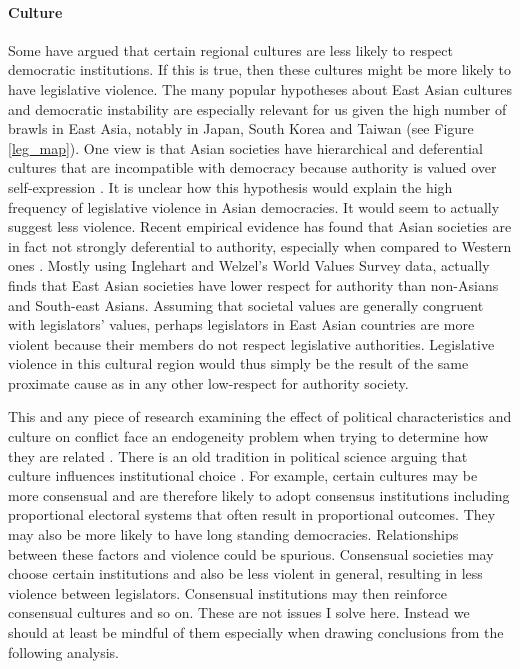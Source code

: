 \documentclass[a4paper]{article}\usepackage[]{graphicx}\usepackage[]{color}
\begin{document}
\paragraph{Culture}

Some have argued that certain regional cultures are less likely to respect democratic institutions. If this is true, then these cultures might be more likely to have legislative violence. The many popular hypotheses about East Asian cultures and democratic instability are especially relevant for us given the high number of brawls in East Asia, notably in Japan, South Korea and Taiwan (see Figure \ref{leg_map}). One view is that Asian societies have hierarchical and deferential cultures that are incompatible with democracy because authority is valued over self-expression \citep[see][212-213 for a discussion]{Dalton2005}. It is unclear how this hypothesis would explain the high frequency of legislative violence in Asian democracies. It would seem to actually suggest less violence. Recent empirical evidence has found that Asian societies are in fact not strongly deferential to authority, especially when compared to Western ones \citep{Dalton2005, KimAsianValues2010}. Mostly using Inglehart and Welzel's World Values Survey data, \cite{KimAsianValues2010} actually finds that East Asian societies have lower respect for authority than non-Asians and South-east Asians. Assuming that societal values are generally congruent with legislators' values, perhaps legislators in East Asian countries are more violent because their members do not respect legislative authorities. Legislative violence in this cultural region would thus simply be the result of the same proximate cause as in any other low-respect for authority society.

This and any piece of research examining the effect of political characteristics and culture on conflict face an endogeneity problem when trying to determine how they are related \citep[][751]{Carey2000}. There is an old tradition in political science \citep[][528--529]{Frye1997} arguing that culture influences institutional choice \citep[in particular see][]{Almond1963}. For example, certain cultures may be more consensual and are therefore likely to adopt consensus institutions \citep[][22-23]{Lijphart2003} including proportional electoral systems that often result in proportional outcomes. They may also be more likely to have long standing democracies. Relationships between these factors and violence could be spurious. Consensual societies may choose certain institutions and also be less violent in general, resulting in less violence between legislators. Consensual institutions may then reinforce consensual cultures and so on. These are not issues I solve here. Instead we should at least be mindful of them especially when drawing conclusions from the following analysis.
\end{document}
